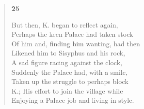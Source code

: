\documentclass{article}
\begin{document}
\begin{verse}
  \begin{center}
    \textbf{25} \\
  \end{center}
  But then, K. began to reflect again, \\
  Perhaps the keen Palace had taken stock \\
  Of him and, finding him wanting, had then \\
  Likened him to Sisyphus and his rock, \\
  A sad figure racing against the clock, \\
  Suddenly the Palace had, with a smile, \\
  Taken up the struggle to perhaps block \\
  K.; His effort to join the village while \\
  Enjoying a Palace job and living in style.
\end{verse}
\end{document}
